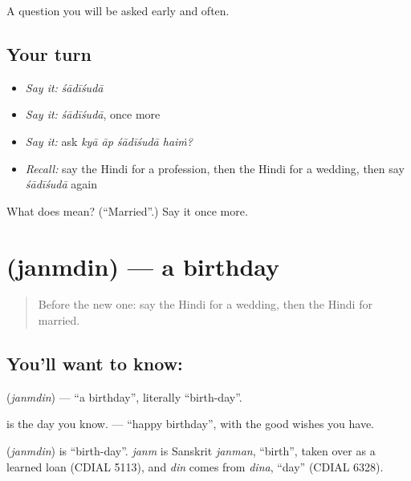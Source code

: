 \begin{grammarlens}[title={What you've built}]
A question you will be asked early and often.
\end{grammarlens}

\subsection*{Your turn}
\begin{itemize}
\raggedright
  \item \emph{Say it:} \emph{śādīśudā}
  \item \emph{Say it:} \emph{śādīśudā}, once more
  \item \emph{Say it:} ask \emph{kyā āp śādīśudā haiṁ?}
  \item \emph{Recall:} say the Hindi for a profession, then the Hindi for a wedding, then say \emph{śādīśudā} again
\end{itemize}

\begin{tcolorbox}[breakable,colback=teal!4,colframe=teal!35!black,title={Before you move on}]
What does  mean? (\textquotedblleft{}Married\textquotedblright{}.) Say it once more.
\end{tcolorbox}
\section[\texorpdfstring{\hi{जन्मदिन} (janmdin)}{जन्मदिन (janmdin)}]{ (janmdin) — a birthday}

\label{lesson:HI-C119-janmdin}



\begin{quote}
Before the new one: say the Hindi for a wedding, then the Hindi for married.
\end{quote}

\subsection*{You'll want to know: }
\textbf{} (\emph{janmdin}) — \textquotedblleft{}a birthday\textquotedblright{}, literally \textquotedblleft{}birth-day\textquotedblright{}.

\textbf{} is the day you know. \textbf{  } — \textquotedblleft{}happy birthday\textquotedblright{}, with the good wishes you have.

\begin{cousinweb}
\textbf{} (\emph{janmdin}) is \textquotedblleft{}birth-day\textquotedblright{}. \emph{janm} is Sanskrit \emph{janman}, \textquotedblleft{}birth\textquotedblright{}, taken over as a learned loan (CDIAL 5113), and \emph{din} comes from \emph{dina}, \textquotedblleft{}day\textquotedblright{} (CDIAL 6328).
\end{cousinweb}

